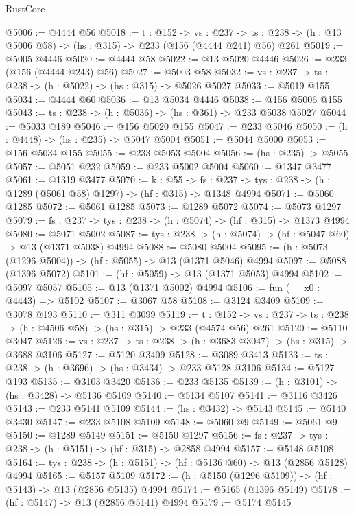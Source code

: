 \begin{lexlean}{RustCore}
\begin{coremodule}
@5006 := @4444 @56
@5018 := {t : @152} ->
  {vs : @237} ->
  {ts : @238} -> (h : @13 @5006 @58) -> (hs : @315) -> @233 (@156 (@4444 @241) @56) @261
@5019 := @5005 @4446
@5020 := @4444 @58
@5022 := @13 @5020 @4446
@5026 := @233 (@156 (@4444 @243) @56)
@5027 := @5003 @58
@5032 := {vs : @237} -> {ts : @238} -> (h : @5022) -> (hs : @315) -> @5026 @5027
@5033 := @5019 @155
@5034 := @4444 @60
@5036 := @13 @5034 @4446
@5038 := @156 @5006 @155
@5043 := {ts : @238} -> (h : @5036) -> (hs : @361) -> @233 @5038 @5027
@5044 := @5033 @189
@5046 := @156 @5020 @155
@5047 := @233 @5046
@5050 := (h : @4448) -> (hs : @235) -> @5047 @5004
@5051 := @5044 @5000
@5053 := @156 @5034 @155
@5055 := @233 @5053 @5004
@5056 := (hs : @235) -> @5055
@5057 := @5051 @232
@5059 := @233 @5002 @5004
@5060 := @1347 @3477
@5061 := @1319 @3477
@5070 := {k : @55} ->
  {fs : @237} -> {tys : @238} -> (h : @1289 (@5061 @58) @1297) -> (hf : @315) -> @1348 @4994
@5071 := @5060 @1285
@5072 := @5061 @1285
@5073 := @1289 @5072
@5074 := @5073 @1297
@5079 := {fs : @237} -> {tys : @238} -> (h : @5074) -> (hf : @315) -> @1373 @4994
@5080 := @5071 @5002
@5087 := {tys : @238} -> (h : @5074) -> (hf : @5047 @60) -> @13 (@1371 @5038) @4994
@5088 := @5080 @5004
@5095 := (h : @5073 (@1296 @5004)) -> (hf : @5055) -> @13 (@1371 @5046) @4994
@5097 := @5088 (@1396 @5072)
@5101 := (hf : @5059) -> @13 (@1371 @5053) @4994
@5102 := @5097 @5057
@5105 := @13 (@1371 @5002) @4994
@5106 := fun (__x0 : @4443) => @5102
@5107 := @3067 @58
@5108 := @3124 @3409
@5109 := @3078 @193
@5110 := @311 @3099
@5119 := {t : @152} ->
  {vs : @237} -> {ts : @238} -> (h : @4506 @58) -> (hs : @315) -> @233 (@4574 @56) @261
@5120 := @5110 @3047
@5126 := {vs : @237} -> {ts : @238} -> (h : @3683 @3047) -> (hs : @315) -> @3688 @3106
@5127 := @5120 @3409
@5128 := @3089 @3413
@5133 := {ts : @238} -> (h : @3696) -> (hs : @3434) -> @233 @5128 @3106
@5134 := @5127 @193
@5135 := @3103 @3420
@5136 := @233 @5135
@5139 := (h : @3101) -> (hs : @3428) -> @5136 @5109
@5140 := @5134 @5107
@5141 := @3116 @3426
@5143 := @233 @5141 @5109
@5144 := (hs : @3432) -> @5143
@5145 := @5140 @3430
@5147 := @233 @5108 @5109
@5148 := @5060 @9
@5149 := @5061 @9
@5150 := @1289 @5149
@5151 := @5150 @1297
@5156 := {fs : @237} -> {tys : @238} -> (h : @5151) -> (hf : @315) -> @2858 @4994
@5157 := @5148 @5108
@5164 := {tys : @238} -> (h : @5151) -> (hf : @5136 @60) -> @13 (@2856 @5128) @4994
@5165 := @5157 @5109
@5172 := (h : @5150 (@1296 @5109)) -> (hf : @5143) -> @13 (@2856 @5135) @4994
@5174 := @5165 (@1396 @5149)
@5178 := (hf : @5147) -> @13 (@2856 @5141) @4994
@5179 := @5174 @5145

\end{coremodule}
\end{lexlean}
